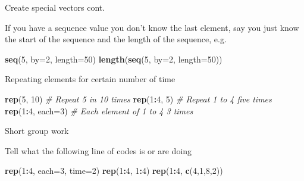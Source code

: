 \documentclass[ignorenonframetext,]{beamer}
\newenvironment{Shaded}{\begin{snugshade}}{\end{snugshade}}
\newcommand{\KeywordTok}[1]{\textcolor[rgb]{0.13,0.29,0.53}{\textbf{#1}}}
\newcommand{\DataTypeTok}[1]{\textcolor[rgb]{0.13,0.29,0.53}{#1}}
\newcommand{\DecValTok}[1]{\textcolor[rgb]{0.00,0.00,0.81}{#1}}
\newcommand{\CommentTok}[1]{\textcolor[rgb]{0.56,0.35,0.01}{\textit{#1}}}
\newcommand{\OperatorTok}[1]{\textcolor[rgb]{0.81,0.36,0.00}{\textbf{#1}}}
\newcommand{\NormalTok}[1]{#1}
\begin{document}
\begin{frame}[fragile]{Create special vectors cont.}

If you have a sequence value you don't know the last element, say you
just know the start of the sequence and the length of the sequence, e.g.

\begin{Shaded}
\begin{Highlighting}[]
\KeywordTok{seq}\NormalTok{(}\DecValTok{5}\NormalTok{, }\DataTypeTok{by=}\DecValTok{2}\NormalTok{, }\DataTypeTok{length=}\DecValTok{50}\NormalTok{)}
\KeywordTok{length}\NormalTok{(}\KeywordTok{seq}\NormalTok{(}\DecValTok{5}\NormalTok{, }\DataTypeTok{by=}\DecValTok{2}\NormalTok{, }\DataTypeTok{length=}\DecValTok{50}\NormalTok{))}
\end{Highlighting}
\end{Shaded}

Repeating elements for certain number of time

\begin{Shaded}
\begin{Highlighting}[]
\KeywordTok{rep}\NormalTok{(}\DecValTok{5}\NormalTok{, }\DecValTok{10}\NormalTok{) }\CommentTok{# Repeat 5 in 10 times}
\KeywordTok{rep}\NormalTok{(}\DecValTok{1}\OperatorTok{:}\DecValTok{4}\NormalTok{, }\DecValTok{5}\NormalTok{) }\CommentTok{# Repeat 1 to 4 five times}
\KeywordTok{rep}\NormalTok{(}\DecValTok{1}\OperatorTok{:}\DecValTok{4}\NormalTok{, }\DataTypeTok{each=}\DecValTok{3}\NormalTok{) }\CommentTok{# Each element of 1 to 4 3 times}
\end{Highlighting}
\end{Shaded}

\end{frame}

\begin{frame}[fragile]{Short group work}

\begin{block}{Tell what the following line of codes is or are doing}

\begin{Shaded}
\begin{Highlighting}[]
\KeywordTok{rep}\NormalTok{(}\DecValTok{1}\OperatorTok{:}\DecValTok{4}\NormalTok{, }\DataTypeTok{each=}\DecValTok{3}\NormalTok{, }\DataTypeTok{time=}\DecValTok{2}\NormalTok{)}
\KeywordTok{rep}\NormalTok{(}\DecValTok{1}\OperatorTok{:}\DecValTok{4}\NormalTok{, }\DecValTok{1}\OperatorTok{:}\DecValTok{4}\NormalTok{)}
\KeywordTok{rep}\NormalTok{(}\DecValTok{1}\OperatorTok{:}\DecValTok{4}\NormalTok{, }\KeywordTok{c}\NormalTok{(}\DecValTok{4}\NormalTok{,}\DecValTok{1}\NormalTok{,}\DecValTok{8}\NormalTok{,}\DecValTok{2}\NormalTok{))}
\end{Highlighting}
\end{Shaded}

\end{block}

\end{frame}
\end{document}
